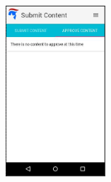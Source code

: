\documentclass[11pt]{article}
\begin{document}
\begin{centering}
    \includegraphics[width=0.28\textwidth]{1.jpg}

\end{centering}
\end{document}
